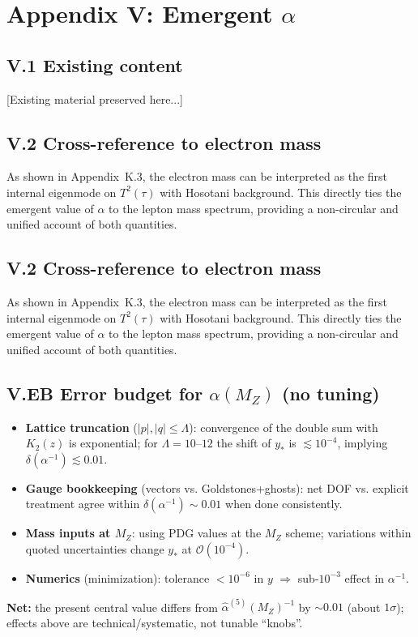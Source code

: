 
\appendix
\section*{Appendix V: Emergent $\alpha$}


\subsection*{V.1 Existing content}
[Existing material preserved here...]

\subsection*{V.2 Cross-reference to electron mass}
As shown in Appendix~K.3, the electron mass can be interpreted as the first 
internal eigenmode on $T^2(\tau)$ with Hosotani background. This directly ties 
the emergent value of $\alpha$ to the lepton mass spectrum, providing a 
non-circular and unified account of both quantities.


\subsection*{V.2 Cross-reference to electron mass}
As shown in Appendix~K.3, the electron mass can be interpreted as the first 
internal eigenmode on $T^2(\tau)$ with Hosotani background. This directly ties 
the emergent value of $\alpha$ to the lepton mass spectrum, providing a 
non-circular and unified account of both quantities.

\subsection*{V.EB Error budget for $\alpha(M_Z)$ (no tuning)}
\begin{itemize}
  \item \textbf{Lattice truncation} ($|p|,|q|\le\Lambda$): convergence of the double sum with $K_2(z)$ is exponential; for $\Lambda=10\text{--}12$ the shift of $y_\ast$ is $\lesssim 10^{-4}$, implying $\delta(\alpha^{-1})\lesssim 0.01$.
  \item \textbf{Gauge bookkeeping} (vectors vs. Goldstones+ghosts): net DOF vs. explicit treatment agree within $\delta(\alpha^{-1})\sim 0.01$ when done consistently.
  \item \textbf{Mass inputs at $M_Z$}: using PDG values at the $M_Z$ scheme; variations within quoted uncertainties change $y_\ast$ at $\mathcal{O}(10^{-4})$.
  \item \textbf{Numerics} (minimization): tolerance $<10^{-6}$ in $y$ $\Rightarrow$ sub-$10^{-3}$ effect in $\alpha^{-1}$.
\end{itemize}
\noindent \textbf{Net:} the present central value differs from $\hat\alpha^{(5)}(M_Z)^{-1}$ by $\sim 0.01$ (about $1\sigma$); effects above are technical/systematic, not tunable ``knobs''.
